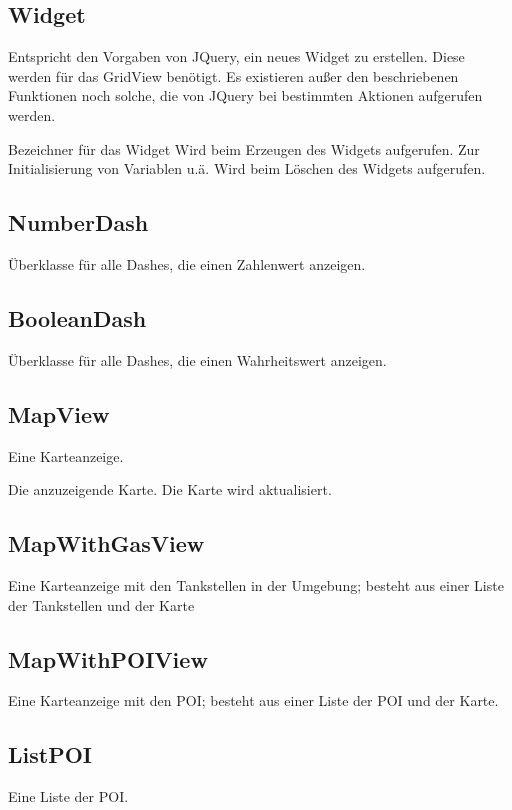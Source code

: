 \documentclass[entwurf.tex]{subfiles}
\begin{document}
		\subsection{Widget}
		\label{Class:Widget}
		Entspricht den Vorgaben von JQuery, ein neues Widget zu erstellen. Diese werden für das GridView benötigt. Es existieren außer den beschriebenen Funktionen noch solche, die von JQuery bei bestimmten Aktionen aufgerufen werden.
		\begin{description}
				Bezeichner für das Widget 
				Wird beim Erzeugen des Widgets aufgerufen. Zur Initialisierung von Variablen u.ä.
				Wird beim Löschen des Widgets aufgerufen.
		\end{description}
		
		\subsection{NumberDash}
		\label{Class:NumberDash}
			Überklasse für alle Dashes, die einen Zahlenwert anzeigen.
		
		\subsection{BooleanDash}
		\label{Class:BooleanDash}
			Überklasse für alle Dashes, die einen Wahrheitswert anzeigen.
			
		\subsection{MapView}
			Eine Karteanzeige.
			\begin{description}
			\attr{map: Map}
			Die anzuzeigende Karte.
			\method{updateMap()}
			Die Karte wird aktualisiert.
			\end{description}
		\subsection{MapWithGasView}
			Eine Karteanzeige mit den Tankstellen in der Umgebung; besteht aus einer
			Liste der Tankstellen und der Karte
		\subsection{MapWithPOIView}
			Eine Karteanzeige mit den POI; besteht aus einer Liste der POI und der
			Karte.
		\subsection{ListPOI}
			Eine Liste der POI.
\end{document}

